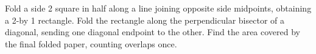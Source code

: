 Fold a side 2 square in half along a line joining opposite side midpoints, obtaining a 2-by 1 rectangle. Fold the rectangle along the perpendicular bisector of a diagonal, sending one diagonal endpoint to the other. Find the area covered by the final folded paper, counting overlaps once.
